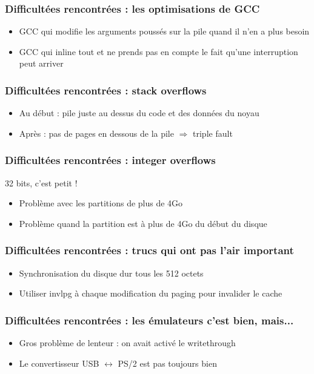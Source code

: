 \documentclass{beamer}
\begin{document}
\begin{frame}
    \frametitle{Difficultées rencontrées : les optimisations de GCC}
    \begin{itemize}
        \item GCC qui modifie les arguments poussés sur la pile quand il n'en a plus besoin
        \item GCC qui inline tout et ne prends pas en compte le fait qu'une interruption peut arriver
    \end{itemize}
\end{frame}

\begin{frame}
    \frametitle{Difficultées rencontrées : stack overflows}
    \begin{itemize}
        \item Au début : pile juste au dessus du code et des données du noyau
        \item Après : pas de pages en dessous de la pile $\Rightarrow$ triple fault
    \end{itemize}
\end{frame}

\begin{frame}
    \frametitle{Difficultées rencontrées : integer overflows}
    32 bits, c'est petit !
    \begin{itemize}
        \item Problème avec les partitions de plus de 4Go
        \item Problème quand la partition est à plus de 4Go du début du disque
    \end{itemize}
\end{frame}

\begin{frame}
    \frametitle{Difficultées rencontrées : trucs qui ont pas l'air important}
    \begin{itemize}
        \item Synchronisation du disque dur tous les 512 octets
        \item Utiliser invlpg à chaque modification du paging pour invalider le cache
    \end{itemize}
\end{frame}

\begin{frame}
    \frametitle{Difficultées rencontrées : les émulateurs c'est bien, mais...}
    \begin{itemize}
        \item Gros problème de lenteur : on avait activé le writethrough
        \item Le convertisseur USB $\leftrightarrow$ PS/2 est pas toujours bien
    \end{itemize}
\end{frame}
\end{document}
